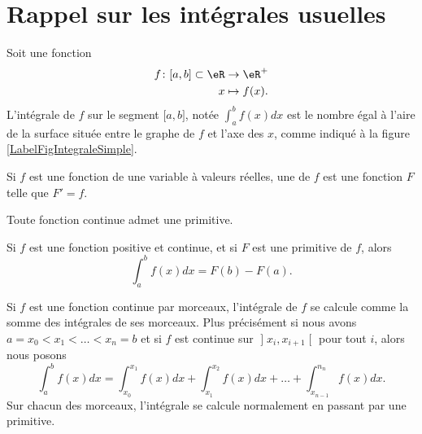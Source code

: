\section{Rappel sur les intégrales usuelles}

Soit une fonction
\begin{equation}
    \begin{aligned}
        f\colon \mathopen[ a , b \mathclose]\subset\eR&\to \eR^+ \\
        x&\mapsto f(x) .
    \end{aligned}
\end{equation}
L'intégrale de $f$ sur le segment $\mathopen[ a , b \mathclose]$, notée $\int_a^bf(x)dx$ est le nombre égal à l'aire de la surface située entre le graphe de $f$ et l'axe des $x$, comme indiqué à la figure \ref{LabelFigIntegraleSimple}.
\newcommand{\CaptionFigIntegraleSimple}{L'intégrale de $f$ entre $a$ et $b$ représente la surface sous la fonction.}


\begin{definition}
    Si $f$ est une fonction de une variable à valeurs réelles, une  de $f$ est une fonction $F$ telle que $F'=f$.
\end{definition}

Toute fonction continue admet une primitive.

\begin{theorem}
    Si $f$ est une fonction positive et continue, et si $F$ est une primitive de $f$, alors
    \begin{equation}
        \int_a^bf(x)dx=F(b)-F(a).
    \end{equation}
\end{theorem}

\begin{remark}
    Si $f$ est une fonction continue par morceaux, l'intégrale de $f$ se calcule comme la somme des intégrales de ses morceaux. Plus précisément si nous avons $a=x_0<x_1<\ldots<x_n=b$ et si $f$ est continue sur $\mathopen] x_i , x_{i+1} \mathclose[$ pour tout $i$, alors nous posons
    \begin{equation}
        \int_a^bf(x)dx=\int_{x_0}^{x_1}f(x)dx+\int_{x_1}^{x_2}f(x)dx+\ldots+\int_{x_{n-1}}^{n_n}f(x)dx.
    \end{equation}
    Sur chacun des morceaux, l'intégrale se calcule normalement en passant par une primitive.
\end{remark}

